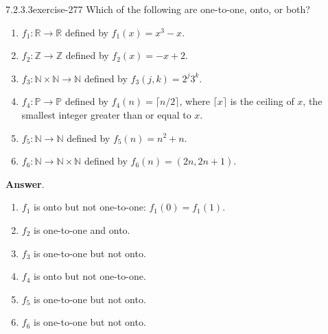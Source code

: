 \documentclass[twoside,10pt,]{book}
\numberwithin{equation}{section}
\begin{document}
\begin{divisionsolution}{7.2.3.3}{}{exercise-277}%
\hypertarget{p-2349}{}%
Which of the following are one-to-one, onto, or both?%
\par
\hypertarget{p-2350}{}%
\leavevmode%
\begin{enumerate}[label=(\alph*)]
\item\hypertarget{li-1204}{}\hypertarget{p-2351}{}%
\(f_1:\mathbb{R} \rightarrow \mathbb{R}\) defined by \(f_1(x) = x^3 - x\).%
\item\hypertarget{li-1205}{}\hypertarget{p-2352}{}%
\(f_2 :\mathbb{Z} \rightarrow  \mathbb{Z}\) defined by \(f_2(x)= -x + 2\).%
\item\hypertarget{li-1206}{}\hypertarget{p-2353}{}%
\(f_3:\mathbb{N} \times \mathbb{N}\to \mathbb{N}\) defined by \(f_3(j, k) =2^j3^k\).%
\item\hypertarget{li-1207}{}\hypertarget{p-2354}{}%
\(f_4 :\mathbb{P} \rightarrow  \mathbb{P}\) defined by \(f_4(n)=\lceil n/2\rceil\), where \(\lceil x\rceil\) is the ceiling of \(x\), the smallest integer greater than or equal to \(x\).%
\item\hypertarget{li-1208}{}\hypertarget{p-2355}{}%
\(f_5 :\mathbb{N} \rightarrow  \mathbb{N}\) defined by \(f_5(n)=n^2+n\).%
\item\hypertarget{li-1209}{}\hypertarget{p-2356}{}%
\(f_6:\mathbb{N} \rightarrow  \mathbb{N} \times  \mathbb{N}\) defined by \(f_6(n)= (2n, 2n+1)\).%
\end{enumerate}
%
\par\smallskip%
\noindent\textbf{Answer}.\quad%
\hypertarget{p-2357}{}%
\leavevmode%
\begin{enumerate}[label=(\alph*)]
\item\hypertarget{li-1210}{}\hypertarget{p-2358}{}%
\(f_1\) is onto but not one-to-one: \(f_1(0)=f_1(1)\).%
\item\hypertarget{li-1211}{}\hypertarget{p-2359}{}%
\(f_2\) is  one-to-one and onto.%
\item\hypertarget{li-1212}{}\hypertarget{p-2360}{}%
\(f_3\) is  one-to-one but not onto.%
\item\hypertarget{li-1213}{}\hypertarget{p-2361}{}%
\(f_4\) is  onto but not one-to-one.%
\item\hypertarget{li-1214}{}\hypertarget{p-2362}{}%
\(f_5\) is  one-to-one but not onto.%
\item\hypertarget{li-1215}{}\hypertarget{p-2363}{}%
\(f_6\) is  one-to-one but not onto.%
\end{enumerate}
%
\end{divisionsolution}%
\end{document}
